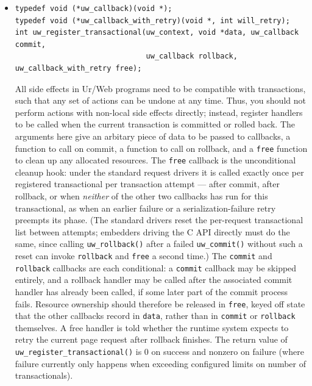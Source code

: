\documentclass{article}
\begin{document}
\begin{itemize}
  \item \begin{verbatim}
typedef void (*uw_callback)(void *);
typedef void (*uw_callback_with_retry)(void *, int will_retry);
int uw_register_transactional(uw_context, void *data, uw_callback commit,
                              uw_callback rollback, uw_callback_with_retry free);
  \end{verbatim}
  All side effects in Ur/Web programs need to be compatible with transactions, such that any set of actions can be undone at any time.  Thus, you should not perform actions with non-local side effects directly; instead, register handlers to be called when the current transaction is committed or rolled back.  The arguments here give an arbitary piece of data to be passed to callbacks, a function to call on commit, a function to call on rollback, and a \texttt{free} function to clean up any allocated resources.  The \texttt{free} callback is the unconditional cleanup hook: under the standard request drivers it is called exactly once per registered transactional per transaction attempt --- after commit, after rollback, or when \emph{neither} of the other two callbacks has run for this transactional, as when an earlier failure or a serialization-failure retry preempts its phase.  (The standard drivers reset the per-request transactional list between attempts; embedders driving the C API directly must do the same, since calling \texttt{uw\_rollback()} after a failed \texttt{uw\_commit()} without such a reset can invoke \texttt{rollback} and \texttt{free} a second time.)  The \texttt{commit} and \texttt{rollback} callbacks are each conditional: a \texttt{commit} callback may be skipped entirely, and a rollback handler may be called after the associated commit handler has already been called, if some later part of the commit process fails.  Resource ownership should therefore be released in \texttt{free}, keyed off state that the other callbacks record in \texttt{data}, rather than in \texttt{commit} or \texttt{rollback} themselves.  A free handler is told whether the runtime system expects to retry the current page request after rollback finishes.  The return value of \texttt{uw\_register\_transactional()} is 0 on success and nonzero on failure (where failure currently only happens when exceeding configured limits on number of transactionals).


\end{itemize}
\end{document}
